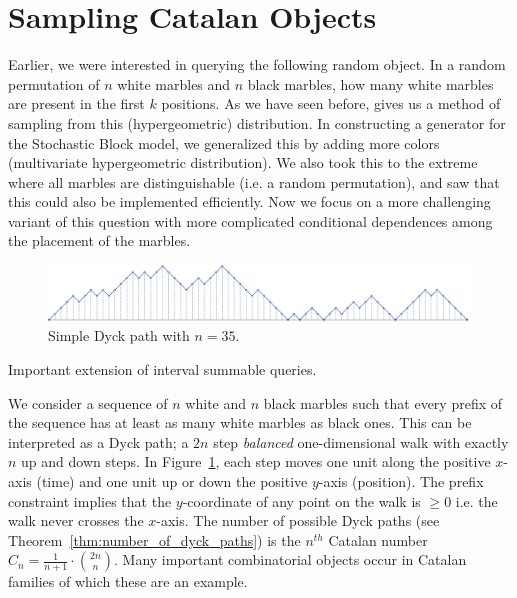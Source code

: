 \section{Sampling Catalan Objects}%
\label{sec:catalan_objects}

Earlier, we were interested in querying the following random object.
In a random permutation of $n$ white marbles and $n$ black marbles, how many white marbles are present in the first $k$ positions.
As we have seen before,  \cite{huge} gives us a method of sampling from this (hypergeometric) distribution.
In constructing a generator for the Stochastic Block model, we generalized this by adding more colors (multivariate hypergeometric distribution).
We also took this to the extreme where all marbles are distinguishable (i.e. a random permutation),
and saw that this could also be implemented efficiently.
Now we focus on a more challenging variant of this question with more complicated conditional dependences among the placement of the marbles.

\begin{figure}[htbp]
    \centering
    \includegraphics[width=\textwidth]{images/basic_dyck_path.pdf}
    \caption{Simple Dyck path with $n = 35$.}
    \label{fig:basic_dyck}
\end{figure}
Important extension of interval summable queries.

We consider a sequence of $n$ white and $n$ black marbles such that every prefix of the sequence has at least as many white marbles as black ones.
This can be interpreted as a Dyck path; a $2n$ step \emph{balanced} one-dimensional walk with exactly $n$ up and down steps.
In Figure~\ref{fig:basic_dyck}, each step moves one unit along the positive $x$-axis (time) and one unit up or down the positive $y$-axis (position).
The prefix constraint implies that the $y$-coordinate of any point on the walk is $\ge 0$ i.e. the walk never crosses the $x$-axis.
The number of possible Dyck paths (see Theorem~\ref{thm:number_of_dyck_paths}) is the $n^{th}$ Catalan number $C_n=\frac{1}{n+1}\cdot{2n\choose n}$.
Many important combinatorial objects occur in Catalan families of which these are an example.

